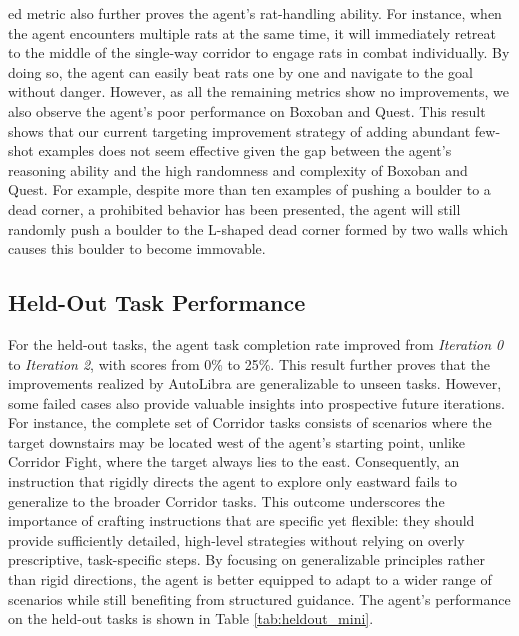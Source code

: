 \begin{flushleft}
ed metric also further proves the agent's rat-handling ability. For instance, when the agent encounters multiple rats at the same time, it will immediately retreat to the middle of the single-way corridor to engage rats in combat individually. By doing so, the agent can easily beat rats one by one and navigate to the goal without danger. However, as all the remaining metrics show no improvements, we also observe the agent's poor performance on Boxoban and Quest. This result shows that our current targeting improvement strategy of adding abundant few-shot examples does not seem effective given the gap between the agent's reasoning ability and the high randomness and complexity of Boxoban and Quest. For example, despite more than ten examples of pushing a boulder to a dead corner, a prohibited behavior has been presented, the agent will still randomly push a boulder to the L-shaped dead corner formed by two walls which causes this boulder to become immovable.


\subsection{Held-Out Task Performance}
For the held-out tasks, the agent task completion rate improved from \emph{Iteration 0} to \emph{Iteration 2}, with scores from 0\% to 25\%. This result further proves that the improvements realized by AutoLibra are generalizable to unseen tasks. However, some failed cases also provide valuable insights into prospective future iterations. For instance, the complete set of Corridor tasks consists of scenarios where the target downstairs may be located west of the agent’s starting point, unlike Corridor Fight, where the target always lies to the east. Consequently, an instruction that rigidly directs the agent to explore only eastward fails to generalize to the broader Corridor tasks. This outcome underscores the importance of crafting instructions that are specific yet flexible: they should provide sufficiently detailed, high-level strategies without relying on overly prescriptive, task-specific steps. By focusing on generalizable principles rather than rigid directions, the agent is better equipped to adapt to a wider range of scenarios while still benefiting from structured guidance. The agent's performance on the held-out tasks is shown in Table \ref{tab:heldout_mini}.

\end{flushleft}


